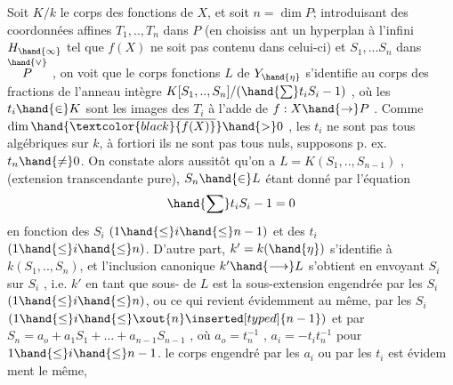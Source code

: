 
 Soit $K/k$ le corps des fonctions de $X$, et soit $n=\dim P$;
introduisant des coordonnées  affines $T_1,..,T_n$ dans $P$ (en choisiss
ant un hyperplan à l'infini $H_\hand{\infty}$ tel que $f(X)$ ne soit pas contenu dans
celui-ci) et $S_1,...S_n$ dans $\overset{\hand{\vee}}{P}$ , on voit que le corps fonctions $L$
de $Y_{\hand{\eta}}$  s'identifie au corps des fractions de l'anneau intègre
$K[S_1,..,S_n]/(\hand{\sum} t_iS_i - 1)$ , où les $t_i \hand{\in} K$ sont les images des $T_i$ à
l'adde de $f:X\hand{\to} P$ . Comme $\dim \hand{\overline{\textcolor{black}{f(X)}}} \hand{>} 0$ , les $t_i$ ne sont pas tous
algébriques sur $k$, à fortiori ils ne sont pas tous nuls, supposons
p. ex. $t_n \hand{\neq} 0$. On constate alors aussitôt qu'on a $L = K(S_1,..,S_{n-1})$ ,
(extension transcendante pure), $S_n\hand{\in} L$ étant donné par l'équation
\[ \hand{\sum} t_iS_i - 1 = 0 \]
en fonction des $S_i$ $(1\hand{\leq} i\hand{\leq} n-1)$ et des $t_i$ $(1\hand{\leq} i\hand{\leq} n)$. D'autre part,
$k' = k(\hand{\eta})$ s'identifie à $k(S_1,..,S_n)$, et l'inclusion canonique
$k'\hand{\longrightarrow} L$ s'obtient en envoyant $S_i$ sur $S_i$ , i.e. $k'$ en tant que sous-%
 de $L$ est la sous-extension engendrée par les $S_i$ $(1\hand{\leq} i\hand{\leq} n)$, ou
ce qui revient évidemment au même, par les $S_i$ $(1\hand{\leq} i\hand{\leq} \xout{n}\inserted[typed]{n-1})$ et par
$S_n = a_o + a_1S_1 + \ldots + a_{n-1}S_{n-1}$ , où $a_o = t_n^{-1}$ , $a_i =-t_it_n^{-1}$ pour
$1\hand{\leq} i\hand{\leq} n-1$.  le corps engendré par les $a_i$ ou par les $t_i$ est évidem
ment le même, 

